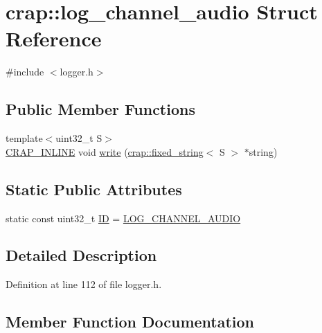 \hypertarget{structcrap_1_1log__channel__audio}{}\section{crap\+:\+:log\+\_\+channel\+\_\+audio Struct Reference}
\label{structcrap_1_1log__channel__audio}


{\ttfamily \#include $<$logger.\+h$>$}

\subsection*{Public Member Functions}
\begin{DoxyCompactItemize}
\item 
{\footnotesize template$<$uint32\+\_\+t S$>$ }\\\hyperlink{config__x86_8h_a5a40526b8d842e7ff731509998bb0f1c}{C\+R\+A\+P\+\_\+\+I\+N\+L\+I\+N\+E} void \hyperlink{structcrap_1_1log__channel__audio_a28a9c9acc9c857e40e0c6a2995f7d9cf}{write} (\hyperlink{classcrap_1_1fixed__string}{crap\+::fixed\+\_\+string}$<$ S $>$ $\ast$string)
\end{DoxyCompactItemize}
\subsection*{Static Public Attributes}
\begin{DoxyCompactItemize}
\item 
static const uint32\+\_\+t \hyperlink{structcrap_1_1log__channel__audio_aed8432decd9efdd91407fa4dee2f598a}{I\+D} = \hyperlink{logger_8h_a14df61b1bef702b4e7b845577658561b}{L\+O\+G\+\_\+\+C\+H\+A\+N\+N\+E\+L\+\_\+\+A\+U\+D\+I\+O}
\end{DoxyCompactItemize}


\subsection{Detailed Description}


Definition at line 112 of file logger.\+h.



\subsection{Member Function Documentation}
\hypertarget{structcrap_1_1log__channel__audio_a28a9c9acc9c857e40e0c6a2995f7d9cf}{}
